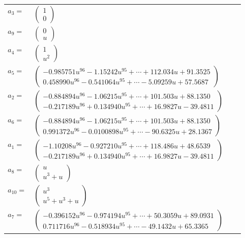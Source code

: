 \documentclass[1p]{elsarticle_modified}
\theoremstyle{definition}
\begin{document}
\begin{tabular}{m{7pt} m{180pt} m{7pt} m{180pt} }
\flushright $a_{3}=$&$\begin{pmatrix}1\\0\end{pmatrix}$ \\
\flushright $a_{9}=$&$\begin{pmatrix}0\\u\end{pmatrix}$ \\
\flushright $a_{4}=$&$\begin{pmatrix}1\\u^2\end{pmatrix}$ \\
\flushright $a_{5}=$&$\begin{pmatrix}-0.985751 u^{96}-1.15242 u^{95}+\cdots+112.034 u+91.3525\\0.458990 u^{96}-0.541064 u^{95}+\cdots-5.09259 u+57.5687\end{pmatrix}$ \\
\flushright $a_{2}=$&$\begin{pmatrix}-0.884894 u^{96}-1.06215 u^{95}+\cdots+101.503 u+88.1350\\-0.217189 u^{96}+0.134940 u^{95}+\cdots+16.9827 u-39.4811\end{pmatrix}$ \\
\flushright $a_{6}=$&$\begin{pmatrix}-0.884894 u^{96}-1.06215 u^{95}+\cdots+101.503 u+88.1350\\0.991372 u^{96}-0.0100898 u^{95}+\cdots-90.6325 u+28.1367\end{pmatrix}$ \\
\flushright $a_{1}=$&$\begin{pmatrix}-1.10208 u^{96}-0.927210 u^{95}+\cdots+118.486 u+48.6539\\-0.217189 u^{96}+0.134940 u^{95}+\cdots+16.9827 u-39.4811\end{pmatrix}$ \\
\flushright $a_{8}=$&$\begin{pmatrix}u\\u^3+u\end{pmatrix}$ \\
\flushright $a_{10}=$&$\begin{pmatrix}u^3\\u^5+u^3+u\end{pmatrix}$ \\
\flushright $a_{7}=$&$\begin{pmatrix}-0.396152 u^{96}-0.974194 u^{95}+\cdots+50.3059 u+89.0931\\0.711716 u^{96}-0.518934 u^{95}+\cdots-49.1432 u+65.3365\end{pmatrix}$ \\

\end{tabular}
\end{document}
